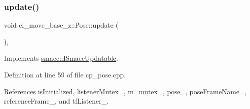 \subsubsection{\texorpdfstring{update()}{update()}}
{\footnotesize\ttfamily void cl\+\_\+move\+\_\+base\+\_\+z\+::\+Pose\+::update (\begin{DoxyParamCaption}{ }\end{DoxyParamCaption})\hspace{0.3cm}{\ttfamily [override]}, {\ttfamily [virtual]}}



Implements \hyperlink{classsmacc_1_1ISmaccUpdatable_a84ee0520cbefdb1d412bed54650b028e}{smacc\+::\+I\+Smacc\+Updatable}.



Definition at line 59 of file cp\+\_\+pose.\+cpp.



References is\+Initialized, listener\+Mutex\+\_\+, m\+\_\+mutex\+\_\+, pose\+\_\+, pose\+Frame\+Name\+\_\+, reference\+Frame\+\_\+, and tf\+Listener\+\_\+.


